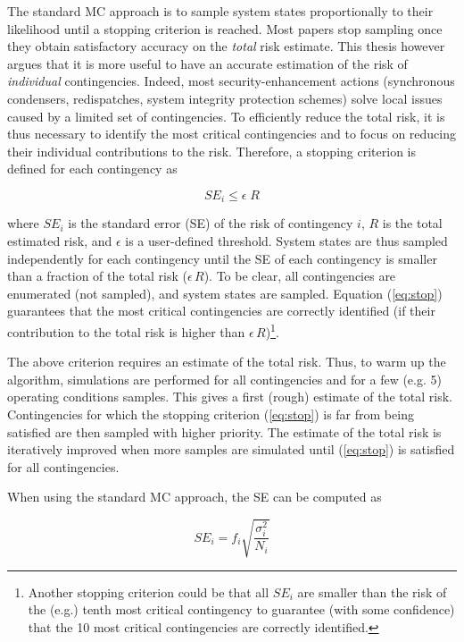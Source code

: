 The standard MC approach is to sample system states proportionally to their likelihood until a stopping criterion is reached. Most papers stop sampling once they obtain satisfactory accuracy on the \emph{total} risk estimate. This thesis however argues that it is more useful to have an accurate estimation of the risk of \emph{individual} contingencies. Indeed, most security-enhancement actions (synchronous condensers, redispatches, system integrity protection schemes) solve local issues caused by a limited set of contingencies. To efficiently reduce the total risk, it is thus necessary to identify the most critical contingencies and to focus on reducing their individual contributions to the risk. Therefore, a stopping criterion is defined for each contingency as

\begin{equation}
  \label{eq:stop}
  SE_i \leq \epsilon \; R
\end{equation}

\noindent where \(SE_i\) is the standard error (SE) of the risk of contingency \(i\), \(R\) is the total estimated risk, and \(\epsilon\) is a user-defined threshold. System states are thus sampled independently for each contingency until the SE of each contingency is smaller than a fraction of the total risk (\(\epsilon \, R\)). To be clear, all contingencies are enumerated (not sampled), and system states are sampled. Equation (\ref{eq:stop}) guarantees that the most critical contingencies are correctly identified (if their contribution to the total risk is higher than \(\epsilon \, R\))\footnote{Another stopping criterion could be that all \(SE_i\) are smaller than the risk of the (e.g.) tenth most critical contingency to guarantee (with some confidence) that the 10 most critical contingencies are correctly identified.}.

The above criterion requires an estimate of the total risk. Thus, to warm up the algorithm, simulations are performed for all contingencies and for a few (e.g. 5) operating conditions samples. This gives a first (rough) estimate of the total risk. Contingencies for which the stopping criterion (\ref{eq:stop}) is far from being satisfied are then sampled with higher priority. The estimate of the total risk is iteratively improved when more samples are simulated until (\ref{eq:stop}) is satisfied for all contingencies.

When using the standard MC approach, the SE can be computed as

\begin{equation}
  \label{eq:SE_classic}
  SE_i = f_i \sqrt{\frac{\sigma_i^2}{N_i}}
\end{equation}

